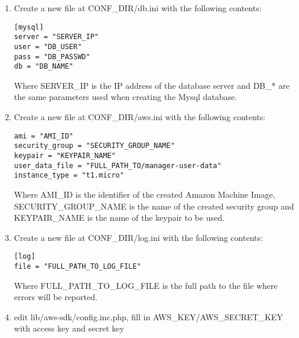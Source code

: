 \documentclass[12pt]{article}
\newenvironment{framedbox}[1]%
{\begin{framed}
 \begingroup
 \fontsize{#1}{#1}\selectfont
}
{
 \endgroup
 \end{framed}
}
\begin{document}
\begin{enumerate}
\item Create a new file at CONF\_DIR/db.ini with the following contents:
\begin{framedbox}{12pt}\begin{verbatim}
[mysql]
server = "SERVER_IP"
user = "DB_USER"
pass = "DB_PASSWD"
db = "DB_NAME"
\end{verbatim}\end{framedbox}
      Where SERVER\_IP is the IP address of the database server and DB\_* are the
      same parameters used when creating the Mysql database.
\item Create a new file at CONF\_DIR/aws.ini with the following contents:
\begin{framedbox}{12pt}\begin{verbatim}
ami = "AMI_ID"
security_group = "SECURITY_GROUP_NAME"
keypair = "KEYPAIR_NAME"
user_data_file = "FULL_PATH_TO/manager-user-data"
instance_type = "t1.micro"
\end{verbatim}\end{framedbox}
      Where AMI\_ID is the identifier of the created Amazon Machine Image,
      SECURITY\_GROUP\_NAME is the name of the created security group and
      KEYPAIR\_NAME is the name of the keypair to be used.
\item Create a new file at CONF\_DIR/log.ini with the following contents:
\begin{framedbox}{12pt}\begin{verbatim}
[log]
file = "FULL_PATH_TO_LOG_FILE"
\end{verbatim}\end{framedbox}
Where FULL\_PATH\_TO\_LOG\_FILE is the full path to the file where errors will be reported.
\item edit lib/aws-sdk/config.inc.php, fill in AWS\_KEY/AWS\_SECRET\_KEY with access key and secret key
\end{enumerate}
\end{document}
